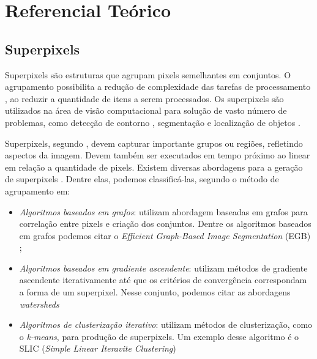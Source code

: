 \begin{document}
\section{Referencial Teórico} \label{sec:ref_teorico}


\subsection{Superpixels} \label{ssec:super}

Superpixels são estruturas que agrupam pixels semelhantes em conjuntos. O agrupamento possibilita a redução de complexidade das tarefas de processamento \cite{SLIC}, ao reduzir a quantidade de itens a serem processados. Os superpixels são utilizados na área de visão computacional para solução de vasto número de problemas, como detecção de contorno \cite{CONTOUR}, segmentação \cite{SEG_MERGE} e localização de objetos \cite{SEG_LOCALIZ}.

Superpixels, segundo \cite{FELZENSZWALB}, devem capturar importante grupos ou regiões, refletindo aspectos da imagem. Devem também ser executados em tempo próximo ao linear em relação a quantidade de pixels. Existem diversas abordagens para a geração de superpixels \cite{SLIC}. Dentre elas, podemos classificá-las, segundo o método de agrupamento em: 

\begin{itemize}
 \item \textit{Algoritmos baseados em grafos}: utilizam abordagem baseadas em grafos para correlação entre pixels e criação dos conjuntos. Dentre os algoritmos baseados em grafos podemos citar o \textit{Efficient Graph-Based Image Segmentation} (EGB) \cite{FELZENSZWALB};
 \item \textit{Algoritmos baseados em gradiente ascendente}: utilizam métodos de gradiente ascendente iterativamente até que os critérios de convergência correspondam a forma de um superpixel. Nesse conjunto, podemos  citar as abordagens \textit{watersheds} \cite{WATERSHEDS} \cite{SLIC}
 \item \textit{Algoritmos de clusterização iterativo}: utilizam métodos de clusterização, como o \textit{k-means}, para produção de superpixels. Um exemplo desse algoritmo é o SLIC (\textit{Simple Linear Iteravite Clustering}) \cite{SLIC}
\end{itemize}

\end{document}
